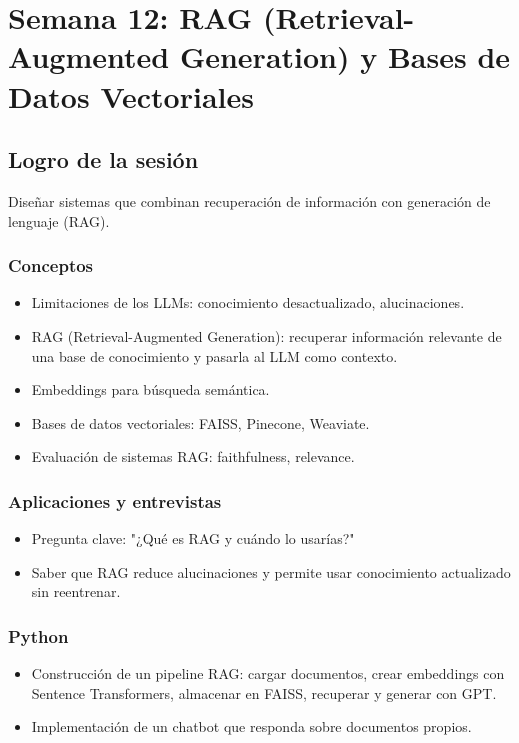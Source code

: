\documentclass[12pt,a4paper,openany,oneside]{book}
\begin{document}
\chapter{Semana 12: RAG (Retrieval-Augmented Generation) y Bases de Datos Vectoriales}

\section{Logro de la sesión}
Diseñar sistemas que combinan recuperación de información con generación de lenguaje (RAG).

\subsection{Conceptos}
\begin{itemize}
    \item Limitaciones de los LLMs: conocimiento desactualizado, alucinaciones.
    \item RAG (Retrieval-Augmented Generation): recuperar información relevante de una base de conocimiento y pasarla al LLM como contexto.
    \item Embeddings para búsqueda semántica.
    \item Bases de datos vectoriales: FAISS, Pinecone, Weaviate.
    \item Evaluación de sistemas RAG: faithfulness, relevance.
\end{itemize}

\subsection{Aplicaciones y entrevistas}
\begin{itemize}
    \item Pregunta clave: "¿Qué es RAG y cuándo lo usarías?"
    \item Saber que RAG reduce alucinaciones y permite usar conocimiento actualizado sin reentrenar.
\end{itemize}

\subsection{Python}
\begin{itemize}
    \item Construcción de un pipeline RAG: cargar documentos, crear embeddings con Sentence Transformers, almacenar en FAISS, recuperar y generar con GPT.
    \item Implementación de un chatbot que responda sobre documentos propios.
\end{itemize}
\end{document}
